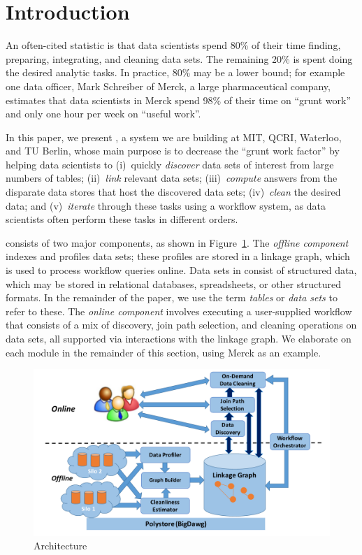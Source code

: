 \section{Introduction}
\label{introduction}

An often-cited statistic is that data scientists spend 80\% of their time finding,
preparing, integrating, and cleaning data sets. The remaining 20\% is spent doing
the desired analytic tasks. In practice, 80\% may be a lower bound; for example
one data officer, Mark Schreiber of Merck, a large pharmaceutical company,
estimates that data scientists in Merck spend 98\% of their time on ``grunt
work'' and only one hour per week on ``useful work''.

In this paper, we present \dcv, a system we are building at MIT, QCRI, Waterloo,
and TU Berlin, whose main purpose is to decrease the ``grunt work factor'' by
helping data scientists to (i)~quickly {\it discover} data sets of interest from
large numbers of tables; (ii)~{\it link} relevant data sets; (iii)~{\it compute} answers from the
disparate data stores that host the discovered data sets; (iv)~{\it clean} the
desired data; and (v)~{\it iterate} through these tasks using a workflow
system, as data scientists often perform these tasks in different orders.


\dcv consists of two major components, as shown in Figure~\ref{fig:arch}.  The
{\it offline component} indexes and profiles data sets;  these profiles are
stored  in a linkage graph, which is used to process workflow queries online.
Data sets in \dcv consist of structured data, which may be stored in relational
databases, spreadsheets, or other structured formats. In the remainder of the
paper, we use the term {\it tables} or {\it data sets} to refer to these.  The
{\it online component} involves executing a user-supplied workflow that consists
of a mix of discovery, join path selection, and cleaning operations on data
sets, all supported via interactions with the linkage graph. We elaborate on
each module in the remainder of this section, using Merck as an example.


\begin{figure}[!t]
\includegraphics[width=\columnwidth]{arch3.pdf}
\caption{\dcv Architecture}
\label{fig:arch}
\end{figure}


